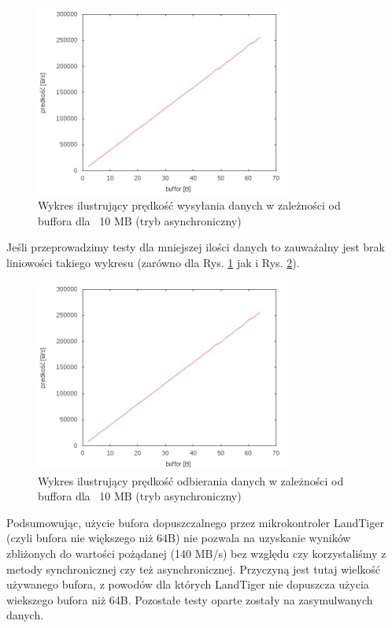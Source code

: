 \documentclass{BscUS}
\begin{document}

\begin{figure}[H]
{
\centering
\includegraphics[width=0.75\textwidth]{./img/A_10737420Send}
\caption{Wykres ilustrujący prędkość wysyłania danych w zależności od buffora dla ~10 MB (tryb asynchroniczny)}
\label{fig:A_10737420Send}
}
\end{figure}

\noindent Jeśli przeprowadzimy testy dla mniejszej ilości danych to zauważalny jest brak liniowości takiego wykresu (zarówno dla Rys. \ref{fig:A_10737420Send} jak i Rys. \ref{fig:A_10737420Receive}).
\begin{figure}[H]
{
\centering
\includegraphics[width=0.75\textwidth]{./img/A_10737420Receive}
\caption{Wykres ilustrujący prędkość odbierania danych w zależności od buffora dla ~10 MB (tryb asynchroniczny)}
\label{fig:A_10737420Receive}
}
\end{figure}

\indent Podsumowując, użycie bufora dopuszczalnego przez mikrokontroler LandTiger (czyli bufora nie większego niż 64B) nie pozwala na uzyskanie wyników zbliżonych do wartości pożądanej (140 MB/s) bez względu czy korzystaliśmy z metody synchronicznej czy też asynchronicznej. Przyczyną jest tutaj wielkość używanego bufora, z powodów dla których LandTiger nie dopuszcza użycia wiekszego bufora niż 64B. Pozostałe testy oparte zostały na zasymulwanych danych. 
\newline
\end{document}
